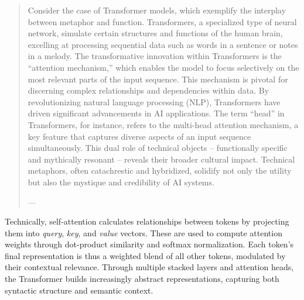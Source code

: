 \begin{quote}
	Consider the case of Transformer models, which exemplify the interplay between metaphor and function. Transformers, a specialized type of neural network, simulate certain structures and functions of the human brain, excelling at processing sequential data such as words in a sentence or notes in a melody. The transformative innovation within Transformers is the “attention mechanism,” which enables the model to focus selectively on the most relevant parts of the input sequence. This mechanism is pivotal for discerning complex relationships and dependencies within data. By revolutionizing natural language processing (NLP), Transformers have driven significant advancements in AI applications. The term “head” in Transformers, for instance, refers to the multi-head attention mechanism, a key feature that captures diverse aspects of an input sequence simultaneously. This dual role of technical objects – functionally specific and mythically resonant – reveals their broader cultural impact. Technical metaphors, often catachrestic and hybridized, solidify not only the utility but also the mystique and credibility of AI systems.

	— \parencite[206]{montanari2025}
\end{quote}





Technically, self-attention calculates relationships between \glspl{token} by projecting them into \emph{query}, \emph{key}, and \emph{value} vectors. These are used to compute attention weights through dot-product similarity and softmax normalization. Each token's final representation is thus a weighted blend of all other tokens, modulated by their contextual relevance. Through multiple stacked layers and attention heads, the Transformer builds increasingly abstract representations, capturing both syntactic structure and semantic context.




